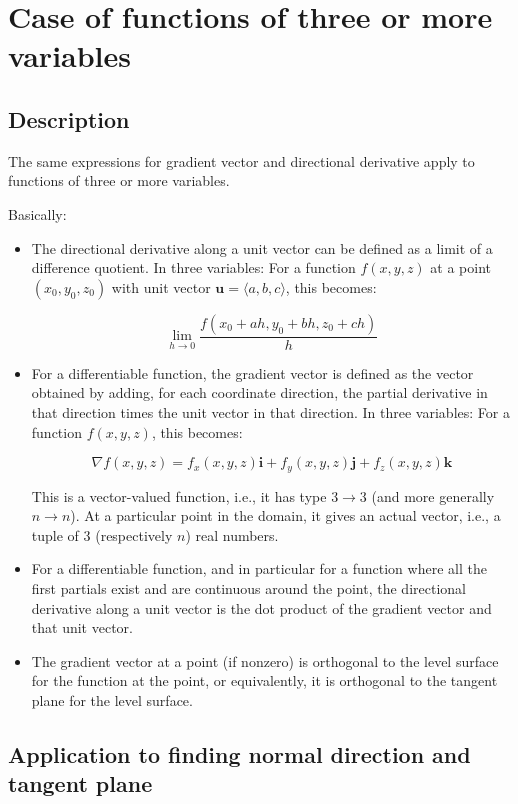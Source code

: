 \documentclass[10pt]{amsart}
\begin{document}
\section{Case of functions of three or more variables}

\subsection{Description}
The same expressions for gradient vector and directional derivative
apply to functions of three or more variables.

Basically:

\begin{itemize}
\item The directional derivative along a unit vector can be defined as
  a limit of a difference quotient. In three variables: For a function
  $f(x,y,z)$ at a point $(x_0,y_0,z_0)$ with unit vector $\mathbf{u} =
  \langle a,b,c \rangle$, this becomes:

  $$\lim_{h \to 0} \frac{f(x_0 + ah,y_0 + bh, z_0 + ch)}{h}$$

\item For a differentiable function, the gradient vector is defined as
  the vector obtained by adding, for each coordinate direction, the
  partial derivative in that direction times the unit vector in that
  direction. In three variables: For a function $f(x,y,z)$, this
  becomes:

  $$\nabla f(x,y,z) = f_x(x,y,z)\mathbf{i} + f_y(x,y,z)\mathbf{j} + f_z(x,y,z)\mathbf{k}$$

  This is a vector-valued function, i.e., it has type $3 \to 3$ (and
  more generally $n \to n$). At a particular point in the domain, it
  gives an actual vector, i.e., a tuple of $3$ (respectively $n$) real
  numbers.
\item For a differentiable function, and in particular for a function
  where all the first partials exist and are continuous around the
  point, the directional derivative along a unit vector is the dot
  product of the gradient vector and that unit vector.
\item The gradient vector at a point (if nonzero) is orthogonal to the
  level surface for the function at the point, or equivalently, it is
  orthogonal to the tangent plane for the level surface.
\end{itemize}

\subsection{Application to finding normal direction and tangent plane}
\end{document}
